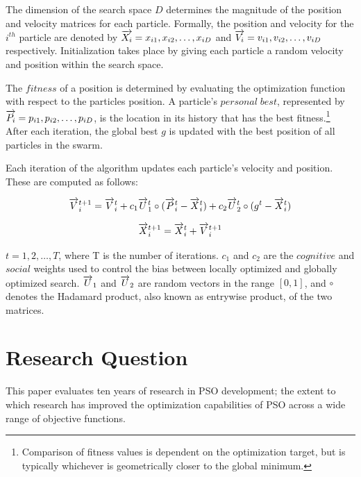 \documentclass{csfourzero}
\newcommand{\rarrow}[1]{\overrightarrow{#1\vphantom{b}}}
\begin{document}
The dimension of the search space $D$ determines the magnitude of the position
and velocity matrices for each particle. Formally, the position and velocity
for the $i^{th}$ particle are denoted by
$\rarrow{X_i} = x_{i1}, x_{i2},\ldots,x_{iD}$ and
$\rarrow{V_i} = v_{i1}, v_{i2},\ldots,v_{iD}$ respectively.
Initialization takes place by giving each particle a random velocity and
position within the search space.

The $fitness$ of a position is determined by evaluating the optimization
function with respect to the particles position. A particle's
$personal\;best$, represented by$\rarrow{P_i} = p_{i1}, p_{i2},\ldots,p_{iD}$,
is the location in its history that has the best fitness.\footnote{Comparison
of fitness values is dependent on the optimization target, but is typically
whichever is geometrically closer to the global minimum.} After each iteration,
the global best $g$ is updated with the best position of all particles in the
swarm.

Each iteration of the algorithm updates each particle's velocity and position.
These are computed as follows:~\cite{ZambranoBigiarini:2013dl}

\begin{equation} \label{eq:orig_v_update}
\rarrow{V}_i^{t+1} = \rarrow{V}_i^t + c_1 \rarrow{U}_1^t \circ (\rarrow{P}_i^t - \rarrow{X}_i^t) + c_2 \rarrow{U}^t_2 \circ (g^t - \rarrow{X}_i^t)
\end{equation}

\begin{equation} \label{eq:orig_p_update}
\rarrow{X}_i^{t+1} = \rarrow{X}_i^t + \rarrow{V}_i^{t+1}
\end{equation}

$t = 1, 2,\ldots,T$, where T is the number of iterations. $c_1$ and $c_2$ are
the $cognitive$ and $social$ weights used to control the bias between locally
optimized and globally optimized search. $\rarrow{U}_1$ and $\rarrow{U}_2$ are
random vectors in the range $[0,1]$, and $\circ$ denotes the Hadamard product,
also known as entrywise product, of the two matrices.

\section{Research Question}

This paper evaluates ten years of research in PSO development; the extent to
which research has improved the optimization capabilities of PSO across a wide
range of objective functions.
\end{document}
